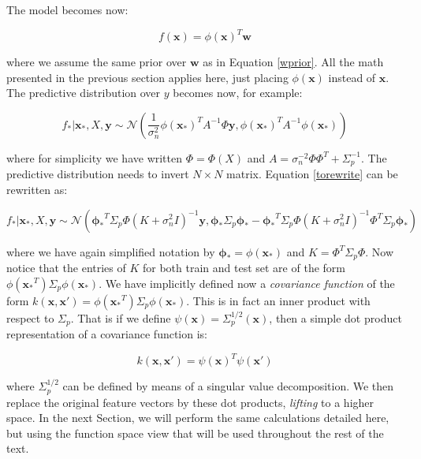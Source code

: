 \documentclass[10pt,a4paper,twoside]{book}
\begin{document}
The model becomes now:

\begin{equation}
f(\boldsymbol{x}) = \phi(\boldsymbol{x})^T \boldsymbol{w}
\end{equation}

where we assume the same prior over $\boldsymbol{w}$ as in Equation \ref{wprior}. All the math presented in the previous section applies here, just placing $\phi(\boldsymbol{x})$ instead of $\boldsymbol{x}$. The predictive distribution over $y$ becomes now, for example:

\begin{equation}
\label{torewrite}
f_{*}|\boldsymbol{x}_{*}, X, \boldsymbol{y} \sim \mathcal{N}\left( \dfrac{1}{\sigma^2_n}\phi(\boldsymbol{x_*})^T A^{-1}\Phi \boldsymbol{y}, \phi(\boldsymbol{x_*})^T A^{-1}\phi(\boldsymbol{x_*})    \right)
\end{equation}

where for simplicity we have written $\Phi = \Phi(X)$ and $A = \sigma_n^{-2}\Phi\Phi^T + \Sigma_p^{-1}$. The predictive distribution needs to invert $N \times N$ matrix. Equation \ref{torewrite} can be rewritten as:

\begin{equation}
f_{*}|\boldsymbol{x}_{*}, X, \boldsymbol{y} \sim \mathcal{N}\left(\boldsymbol{\phi_*}^T\Sigma_p\Phi(K + \sigma^2_n I)^{-1}\boldsymbol{y}, \boldsymbol{\phi_*}\Sigma_p\boldsymbol{\phi_*} - \boldsymbol{\phi_*}^T\Sigma_p\Phi(K + \sigma^2_n I)^{-1}\Phi^T\Sigma_p\boldsymbol{\phi_*}\right)
\end{equation}

where we have again simplified notation by $\boldsymbol{\phi_*} = \phi(\boldsymbol{x_*})$ and $K = \Phi^T\Sigma_p\Phi$. Now notice that the entries of $K$ for both train and test set are of the form  $\phi(\boldsymbol{x_*}^T)\Sigma_p\phi(\boldsymbol{x_*})$. We have implicitly defined now a \textit{covariance function} of the form $k(\boldsymbol{x}, \boldsymbol{x'}) = \phi(\boldsymbol{x_*}^T)\Sigma_p\phi(\boldsymbol{x_*})$. This is in fact an inner product with respect to $\Sigma_p$. That is if we define $\psi(\boldsymbol{x}) = \Sigma_p^{1/2}(\boldsymbol{x})$, then a simple dot product representation of a covariance function is:

\begin{equation}
k(\boldsymbol{x}, \boldsymbol{x'}) = \psi(\boldsymbol{x})^T\psi(\boldsymbol{x'})
\end{equation}

where $\Sigma_p^{1/2}$ can be defined by means of a singular value decomposition. We then replace the original feature vectors by these dot products, \textit{lifting} to a higher space. In the next Section, we will perform the same calculations detailed here, but using the function space view that will be used throughout the rest of the text.
\end{document}
